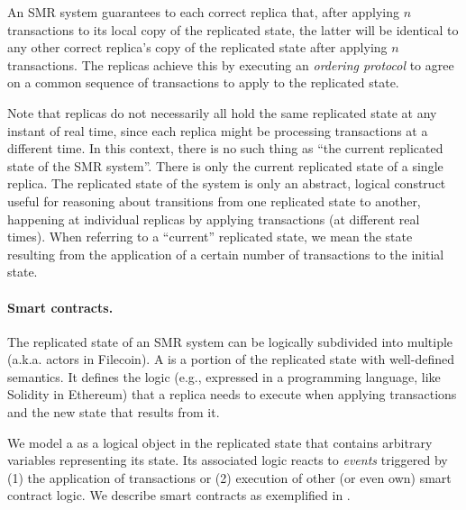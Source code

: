 An SMR system guarantees to each correct replica that, after applying $n$ transactions to its local copy of the replicated state,
the latter will be identical to any other correct replica’s copy of the replicated state after applying $n$ transactions.
The replicas achieve this by executing an \emph{ordering protocol} to agree on a common sequence of transactions to apply to the replicated state.

Note that replicas do not necessarily all hold the same replicated state at any instant of real time,
since each replica might be processing transactions at a different time.
In this context, there is no such thing as “the current replicated state of the SMR system”.
There is only the current replicated state of a single replica.
The replicated state of the system is only an abstract, logical construct
useful for reasoning about transitions from one replicated state to another,
happening at individual replicas by applying transactions (at different real times).
When referring to a “current” replicated state, we mean the state resulting from the application of a certain number of transactions to the initial state.

\paragraph{Smart contracts.}
The replicated state of an SMR system can be logically subdivided into multiple \emph{\dapps} (a.k.a. actors in Filecoin).
A \dapp is a portion of the replicated state with well-defined semantics.
It defines the logic (e.g., expressed in a programming language, like Solidity in Ethereum)
that a replica needs to execute when applying transactions and the new state that results from it.

We model a \dapp as a logical object in the replicated state that contains arbitrary variables representing its state.
Its associated logic reacts to \emph{events} triggered by (1) the application of transactions or (2) execution of other (or even own) smart contract logic. We describe smart contracts as exemplified in .

